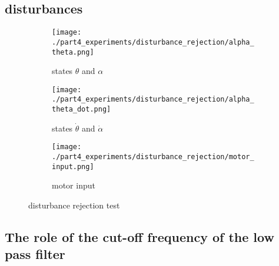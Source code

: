 \subsection{disturbances}
	\begin{figure}[H]
		\centering
		\begin{subfigure}[b]{0.45\textwidth}
			\texttt{[image: ./part4\_experiments/disturbance\_rejection/alpha\_theta.png]}
			\caption{states $\theta$ and $\alpha$}
		\end{subfigure}
		\begin{subfigure}[b]{0.45\textwidth}
			\texttt{[image: ./part4\_experiments/disturbance\_rejection/alpha\_theta\_dot.png]}
			\caption{states $\dot{\theta}$ and $\dot{\alpha}$}
		\end{subfigure}
		\begin{subfigure}[b]{0.45\textwidth}
			\texttt{[image: ./part4\_experiments/disturbance\_rejection/motor\_input.png]}
			\caption{motor input}
		\end{subfigure}
		\caption{disturbance rejection test}
	\end{figure}

\subsection{The role of the cut-off frequency of the low pass filter}


